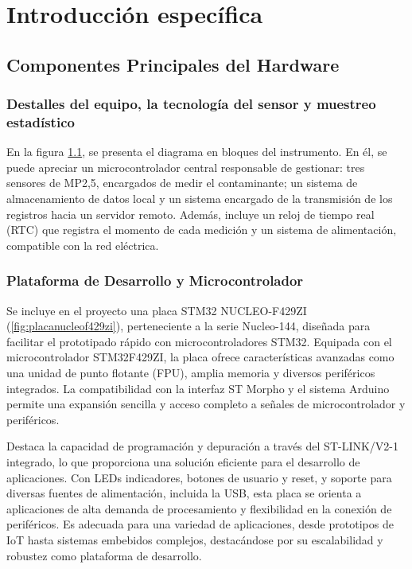 \chapter{Introducción específica}

\section{Componentes Principales del Hardware}

\subsection{Destalles del equipo, la tecnología del sensor y muestreo estadístico}

En la figura \ref{fig:diagBloques}, se presenta el diagrama en bloques del instrumento. En él, se puede apreciar un microcontrolador central responsable de gestionar: tres sensores de MP2,5, encargados de medir el contaminante; un sistema de almacenamiento de datos local y un sistema encargado de la transmisión de los registros hacia un servidor remoto. Además, incluye un reloj de tiempo real (RTC) que registra el momento de cada medición y un sistema de alimentación, compatible con la red eléctrica.

\begin{figure}[htpb]
    
	\label{fig:diagBloques}
\end{figure}


\subsection{Plataforma de Desarrollo y Microcontrolador}

Se incluye en el proyecto una placa STM32 NUCLEO-F429ZI (\ref{fig:placanucleof429zi}), perteneciente a la serie Nucleo-144, diseñada para facilitar el prototipado rápido con microcontroladores STM32. Equipada con el microcontrolador STM32F429ZI, la placa ofrece características avanzadas como una unidad de punto flotante (FPU), amplia memoria y diversos periféricos integrados. La compatibilidad con la interfaz ST Morpho y el sistema Arduino permite una expansión sencilla y acceso completo a señales de microcontrolador y periféricos.

Destaca la capacidad de programación y depuración a través del ST-LINK/V2-1 integrado, lo que proporciona una solución eficiente para el desarrollo de aplicaciones. Con LEDs indicadores, botones de usuario y reset, y soporte para diversas fuentes de alimentación, incluida la USB, esta placa se orienta a aplicaciones de alta demanda de procesamiento y flexibilidad en la conexión de periféricos. Es adecuada para una variedad de aplicaciones, desde prototipos de IoT hasta sistemas embebidos complejos, destacándose por su escalabilidad y robustez como plataforma de desarrollo.

